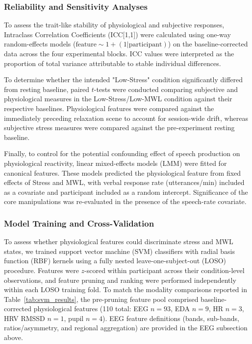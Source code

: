 \documentclass[lettersize,journal]{IEEEtran}
\begin{document}
\subsubsection{Reliability and Sensitivity Analyses}
To assess the trait-like stability of physiological and subjective responses, Intraclass Correlation Coefficients (ICC[1,1]) were calculated using one-way random-effects models ($\mathrm{feature} \sim 1 + (1|\mathrm{participant})$) on the baseline-corrected data across the four experimental blocks. ICC values were interpreted as the proportion of total variance attributable to stable individual differences.

To determine whether the intended "Low-Stress" condition significantly differed from resting baseline, paired $t$-tests were conducted comparing subjective and physiological measures in the Low-Stress/Low-MWL condition against their respective baselines. Physiological features were compared against the immediately preceding relaxation scene to account for session-wide drift, whereas subjective stress measures were compared against the pre-experiment resting baseline.

Finally, to control for the potential confounding effect of speech production on physiological reactivity, linear mixed-effects models (LMM) were fitted for canonical features. These models predicted the physiological feature from fixed effects of Stress and MWL, with verbal response rate (utterances/min) included as a covariate and participant included as a random intercept. Significance of the core manipulations was re-evaluated in the presence of the speech-rate covariate.

\subsubsection{Model Training and Cross-Validation}

To assess whether physiological features could discriminate stress and MWL states, we trained support vector machine (SVM) classifiers with radial basis function (RBF) kernels using a fully nested leave-one-subject-out (LOSO) procedure. Features were $z$-scored within participant across their condition-level observations, and feature pruning and ranking were performed independently within each LOSO training fold.
To match the modality comparisons reported in Table~\ref{tab:svm_results}, the pre-pruning feature pool comprised baseline-corrected physiological features (110 total: EEG $n=93$, EDA $n=9$, HR $n=3$, HRV RMSSD $n=1$, pupil $n=4$). EEG feature definitions (bands, sub-bands, ratios/asymmetry, and regional aggregation) are provided in the EEG subsection above.
\end{document}
